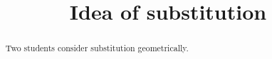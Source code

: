 \documentclass{ximera}
\title[Break-Ground:]{Idea of substitution}
\begin{document}
\begin{abstract}
Two students consider substitution geometrically.
\end{abstract}
\maketitle










\end{document}
